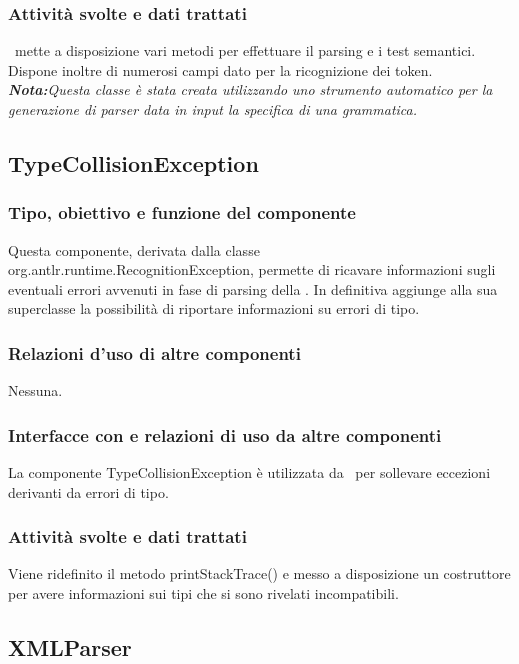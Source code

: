 \subsubsection{Attivit\`a svolte e dati trattati}
\brp\ mette a disposizione vari metodi per effettuare il parsing e i test semantici. Dispone inoltre di numerosi campi dato per la ricognizione dei token.\\
\textit{\textbf{Nota:}Questa classe \`e stata creata utilizzando uno strumento automatico per la generazione di parser data in input la specifica di una grammatica.}

\subsection{TypeCollisionException}
\subsubsection{Tipo, obiettivo e funzione del componente}
Questa componente, derivata dalla classe\\ org.antlr.runtime.RecognitionException, permette di ricavare informazioni sugli eventuali errori avvenuti in fase di parsing della \br. In definitiva aggiunge alla sua superclasse la possibilit\`a di riportare informazioni su errori di tipo.
\subsubsection{Relazioni d'uso di altre componenti}
Nessuna.
\subsubsection{Interfacce con e relazioni di uso da altre componenti}
La componente TypeCollisionException \`e utilizzata da \brp\ per sollevare eccezioni derivanti da errori di tipo.
\subsubsection{Attivit\`a svolte e dati trattati}
Viene ridefinito il metodo printStackTrace() e messo a disposizione un costruttore per avere informazioni sui tipi che si sono rivelati incompatibili.

\subsection{XMLParser}%
